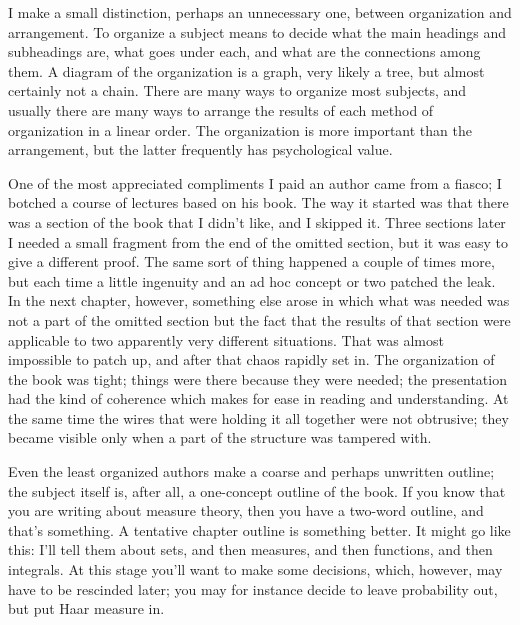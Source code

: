 \documentclass[12pt]{article}
\begin{document}
I make a small distinction, perhaps an unnecessary one, between organization and arrangement. To organize a subject means to decide what the main headings and subheadings are, what goes under each, and what are the connections among them. A diagram of the organization is a graph, very likely a tree, but almost certainly not a chain. There are many ways to organize most subjects, and usually there are many ways to arrange the results of each method of organization in a linear order. The organization is more important than the arrangement, but the latter frequently has psychological value. 

One of the most appreciated compliments I paid an author came from a fiasco; I botched a course of lectures based on his book. The way it started was that there was a section of the book that I didn't like, and I skipped it. Three sections later I needed a small fragment from the end of the omitted section, but it was easy to give a different proof. The same sort of thing happened a couple of times more, but each time a little ingenuity and an ad hoc concept or two patched the leak. In the next chapter, however, something else arose in which what was needed was not a part of the omitted section but the fact that the results of that section were applicable to two apparently very different situations. That was almost impossible to patch up, and after that chaos rapidly set in. The organization of the book was tight; things were there because they were needed; the presentation had the kind of coherence which makes for ease in reading and understanding. At the same time the wires that were holding it all together were not obtrusive; they became visible only when a part of the structure was tampered with. 

Even the least organized authors make a coarse and perhaps unwritten outline; the subject itself is, after all, a one-concept outline of the book. If you know that you are writing about measure theory, then you have a two-word outline, and that's something. A tentative chapter outline is something better. It might go like this: I'll tell them about sets, and then measures, and then functions, and then integrals. At this stage you'll want to make some decisions, which, however, may have to be rescinded later; you may for instance decide to leave probability out, but put Haar measure in.
\end{document}

